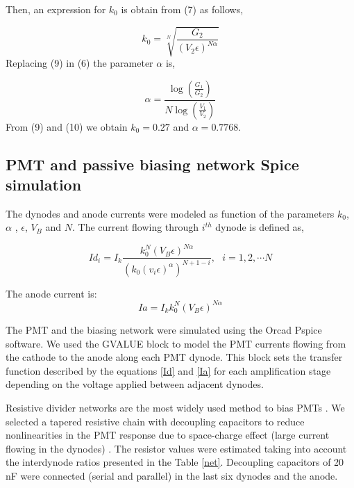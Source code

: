 \documentclass[letterpaper, 10 pt, conference]{ieeeconf}  %
\begin{document}
Then, an expression for $k_0$ is obtain from (7) as follows,

\begin{equation}
k_0=\sqrt[N]{\frac{G_2}{(V_2\epsilon)^{N \alpha}}}
\end{equation}
Replacing (9) in (6) the parameter $\alpha$ is,

\begin{equation}
\alpha=\frac{\log \left( \frac{G_1}{G_2} \right)}{N \log \left( \frac{V_1}{V_2} \right)}
\end{equation}
From (9) and (10) we obtain $k_0=0.27$ and $\alpha= 0.7768$.


\subsection{PMT and passive biasing network Spice simulation}

The dynodes and anode currents were modeled as function of the parameters $k_0$, $\alpha$ , $\epsilon$, $V_B$ and $N$. The current flowing through $i^{th}$ dynode is defined as,

\begin{equation}
Id_{i} = I_k \frac{k_0^N (V_B \epsilon)^{N \alpha}}{(k_0 (v_i \epsilon)^\alpha)^{N+1-i}}, \ \ \ i=1,2, \cdots N
\label{Id}
\end{equation}

The anode current is:
\begin{equation}
Ia = I_k k_0^N (V_B \epsilon)^{N \alpha}
\label{Ia}
\end{equation}

The PMT and the biasing network were simulated using the Orcad Pspice software. We used the GVALUE  \cite{Krihely2014} block to model the PMT currents flowing from the cathode to the anode along each PMT dynode. This block sets the transfer function described by the equations \ref{Id} and \ref{Ia} for each amplification stage depending on the voltage applied between adjacent dynodes. 


Resistive divider networks are the most widely used method to bias PMTs \cite{Camin1999PassiveAA}. We selected a tapered resistive chain with decoupling capacitors to reduce nonlinearities in the PMT response due to space-charge effect (large current flowing in the dynodes) \cite{Huang_2013, Hamamatsu2007}. The resistor values were estimated taking into account the interdynode ratios presented in the Table \ref{net}. Decoupling capacitors of 20 nF were connected (serial and parallel) in the last six dynodes and the anode.
\end{document}
